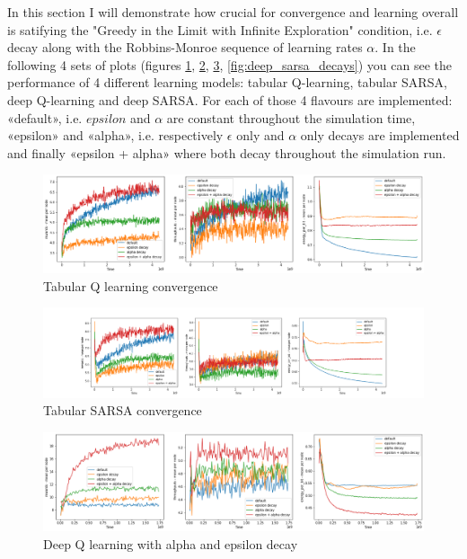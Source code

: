 In this section I will demonstrate how crucial for 
convergence and learning overall is satifying 
the "Greedy in the Limit with Infinite Exploration"
condition, i.e. $\epsilon$ decay along with the Robbins-Monroe sequence of learning rates $\alpha$.
In the following 4 sets of plots (figures
\ref{fig:tabular_q_decays},
\ref{fig:tabular_sarsa_decays}, 
\ref{fig:deep_q_decays}, \ref{fig:deep_sarsa_decays})
you can see the 
performance of 4 different learning models: tabular Q-learning, tabular SARSA, deep Q-learning and deep SARSA. For each of those 4 flavours are implemented:
«default», i.e. $epsilon$ and $\alpha$ are constant
throughout the simulation time, «epsilon» and «alpha»,
i.e. respectively $\epsilon$ only and $\alpha$ only 
decays are implemented and finally «epsilon + alpha»
where both decay throughout the simulation run.

\begin{figure}[H]
\centering
\hspace*{-1.1cm}  
\includegraphics[scale=0.40]{plots/decays/tabular_q_learning_decay_SMALL.png}
  \caption{Tabular Q learning convergence}
  \label{fig:tabular_q_decays}
\end{figure}

\begin{figure}[H]
\centering
\hspace*{-3.3cm}  
\includegraphics[scale=0.40]{plots/decays/decay_tabular_sarsa_SMALL.png}
  \caption{Tabular SARSA convergence}
  \label{fig:tabular_sarsa_decays}
\end{figure}

\begin{figure}[H]
\centering
\hspace*{-1.1cm}  
\includegraphics[scale=0.40]{plots/decays/deep_q_decay_SMALL.png}
  \caption{Deep Q learning with alpha and epsilon decay}
  \label{fig:deep_q_decays}
\end{figure}

